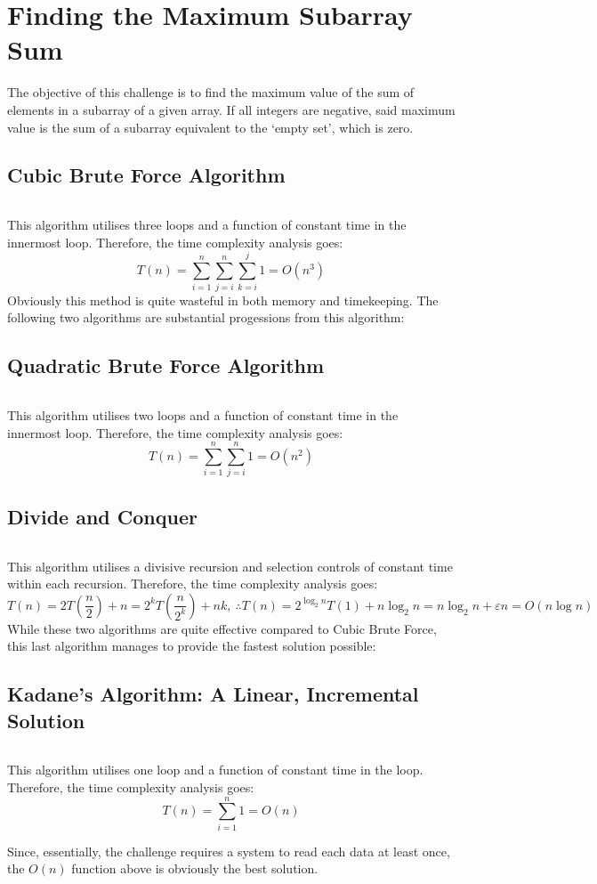 \chapter{Finding the Maximum Subarray Sum}
The objective of this challenge is to find the maximum value of the sum of
elements in a subarray of a given array. If all integers are negative, said
maximum value is the sum of a subarray equivalent to the `empty set', which is
zero.

\section{Cubic Brute Force Algorithm}
\inputminted[firstline=6,lastline=15]{cpp}{../Algorithms/maxsubarray.cpp}
This algorithm utilises three loops and a function of constant time in the
innermost loop. Therefore, the time complexity analysis goes:
\[ T(n)=\sum_{i=1}^n\sum_{j=i}^n\sum_{k=i}^j1=O\left(n^3\right) \]
Obviously this method is quite wasteful in both memory and timekeeping. The
following two algorithms are substantial progessions from this algorithm:
\newpage

\section{Quadratic Brute Force Algorithm}
\inputminted[firstline=18,lastline=27]{cpp}{../Algorithms/maxsubarray.cpp}
This algorithm utilises two loops and a function of constant time in the
innermost loop. Therefore, the time complexity analysis goes:
\[ T(n)=\sum_{i=1}^n\sum_{j=i}^n1=O\left(n^2\right) \]

\section{Divide and Conquer}
\inputminted[firstline=30,lastline=49]{cpp}{../Algorithms/maxsubarray.cpp}
This algorithm utilises a divisive recursion and selection controls of constant
time within each recursion. Therefore, the time complexity analysis goes:
\[ T(n)=2T\left(\frac{n}{2}\right)+n=2^kT\left(\frac{n}{2^k}\right)+nk,~
\therefore T(n)=2^{\log_2n}T(1)+n\log_2n=n\log_2n+\varepsilon n=O(n\log n) \]
\newpage
While these two algorithms are quite effective compared to Cubic Brute Force,
this last algorithm manages to provide the fastest solution possible:

\section{Kadane's Algorithm: A Linear, Incremental Solution}
\inputminted[firstline=52,lastline=59]{cpp}{../Algorithms/maxsubarray.cpp}
This algorithm utilises one loop and a function of constant time in the loop.
Therefore, the time complexity analysis goes: \[ T(n)=\sum_{i=1}^n1=O(n) \]

Since, essentially, the challenge requires a system to read each data at least
once, the $O(n)$ function above is obviously the best solution.
